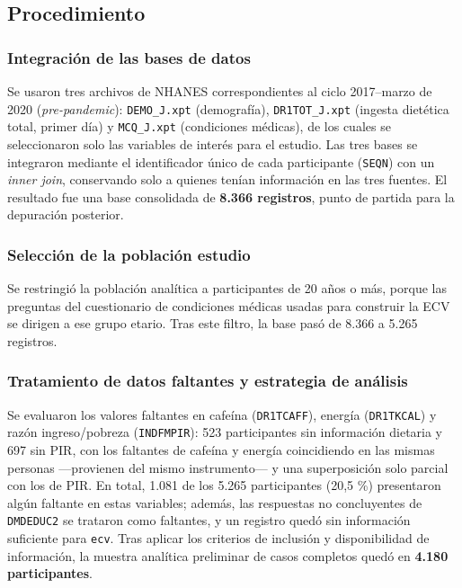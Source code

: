 \documentclass[
  spanish,
  12pt,
]{article}
\begin{document}
\subsection{Procedimiento}\label{procedimiento}

\subsubsection{Integración de las bases de datos}\label{integraciuxf3n-de-las-bases-de-datos}

Se usaron tres archivos de NHANES correspondientes al ciclo 2017--marzo
de 2020 (\emph{pre-pandemic}): \texttt{DEMO\_J.xpt} (demografía), \texttt{DR1TOT\_J.xpt}
(ingesta dietética total, primer día) y \texttt{MCQ\_J.xpt} (condiciones
médicas), de los cuales se seleccionaron solo las variables de interés
para el estudio. Las tres bases se integraron mediante el identificador
único de cada participante (\texttt{SEQN}) con un \emph{inner join}, conservando
solo a quienes tenían información en las tres fuentes. El resultado fue
una base consolidada de \textbf{8.366 registros}, punto de partida para la
depuración posterior.

\subsubsection{Selección de la población estudio}\label{selecciuxf3n-de-la-poblaciuxf3n-estudio}

Se restringió la población analítica a participantes de 20 años o más,
porque las preguntas del cuestionario de condiciones médicas usadas
para construir la ECV se dirigen a ese grupo etario. Tras este filtro,
la base pasó de 8.366 a 5.265 registros.

\subsubsection{Tratamiento de datos faltantes y estrategia de análisis}\label{tratamiento-de-datos-faltantes-y-estrategia-de-anuxe1lisis}

Se evaluaron los valores faltantes en cafeína (\texttt{DR1TCAFF}), energía
(\texttt{DR1TKCAL}) y razón ingreso/pobreza (\texttt{INDFMPIR}): 523 participantes sin
información dietaria y 697 sin PIR, con los faltantes de cafeína y
energía coincidiendo en las mismas personas ---provienen del mismo
instrumento--- y una superposición solo parcial con los de PIR. En
total, 1.081 de los 5.265 participantes (20,5 \%) presentaron algún
faltante en estas variables; además, las respuestas no concluyentes de
\texttt{DMDEDUC2} se trataron como faltantes, y un registro quedó sin
información suficiente para \texttt{ecv}. Tras aplicar los criterios de
inclusión y disponibilidad de información, la muestra analítica
preliminar de casos completos quedó en \textbf{4.180 participantes}.
\end{document}
